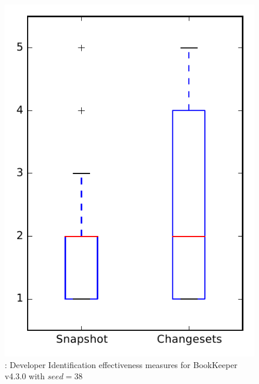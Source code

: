 
\begin{figure}
\centering
\includegraphics[height=0.4\textheight]{figures/dit_seed/rq1_bookkeeper_38}
\caption{\rtwo: Developer Identification effectiveness measures for BookKeeper v4.3.0 with $seed=38$}
\label{fig:dit_seed:rq1:bookkeeper}
\end{figure}

